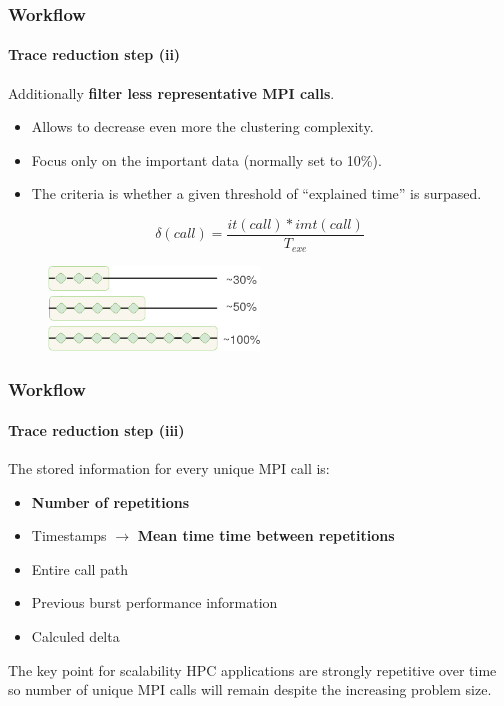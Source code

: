 \documentclass{beamer}
\begin{document}
\begin{frame}
\frametitle{Workflow}
\framesubtitle{Trace reduction step (ii)}
Additionally \textbf{filter less representative MPI calls}.
\begin{itemize}
	\item Allows to decrease even more the clustering complexity.
	\item Focus only on the important data (normally set to 10\%).
	\item The criteria is whether a given threshold of ``explained time'' is surpased.
\end{itemize}
\begin{equation}
	\delta(call) = \frac{it(call)*imt(call)}{T_{exe}}
\end{equation}
\begin{figure}
	\includegraphics[width=0.5\textwidth]{imgs/workflow_reduction_2.png}
\end{figure}
\end{frame}

\begin{frame}
\frametitle{Workflow}
\framesubtitle{Trace reduction step (iii)}
The stored information for every unique MPI call is:
\begin{itemize}
	\item \textbf{Number of repetitions}
	\item Timestamps $\rightarrow$ \textbf{Mean time time between repetitions}
	\item Entire call path
	\item Previous burst performance information
	\item Calculed delta
\end{itemize}
\vfill
\pause
\begin{block}{The key point for scalability}
	HPC applications are strongly repetitive over time so number of unique MPI calls will remain despite the increasing problem size.
\end{block}
\end{frame}
\end{document}
